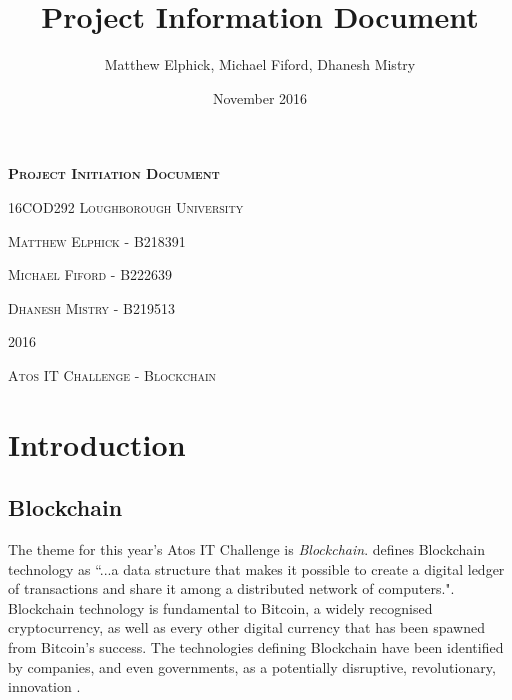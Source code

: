 \documentclass{article}
\title{Project Information Document}
\author{Matthew Elphick, Michael Fiford, Dhanesh Mistry}
\date{November 2016}
\begin{document}
\begin{titlepage}
\begin{center}
\textbf{\textsc{\Huge Project Initiation Document}}
\par
\vspace{0.5cm}
\textsc{\huge 16COD292}
\vfill
\textsc{\Huge Loughborough University}
\vspace{1cm}
\par
\textsc{\huge Matthew Elphick - B218391}
\par
\vspace{0.2cm}
\textsc{\huge Michael Fiford - B222639}
\par
\vspace{0.2cm}
\textsc{\huge Dhanesh Mistry - B219513}
\vspace{1cm}
\par
\textsc{\Huge 2016}
\end{center}
\end{titlepage}

\maketitle

\tableofcontents
\newpage

\begin{spacing}{2}
    \begin{center}
        \textsc{\huge{Atos IT Challenge - Blockchain}}
    \end{center}
\end{spacing}

\section{Introduction}


\subsection{Blockchain}

The theme for this year's Atos IT Challenge is \emph{Blockchain}. \textcite{cioblockchain} defines Blockchain technology as ``...a data structure that makes it possible to create a digital ledger of transactions and share it among a distributed network of computers.". Blockchain technology is fundamental to Bitcoin, a widely recognised cryptocurrency, as well as every other digital currency that has been spawned from Bitcoin's success. The technologies defining Blockchain have been identified by companies, and even governments, as a potentially disruptive, revolutionary, innovation \parencite{ukdlt, nomura_research_institute_survey_2016}.
\end{document}
